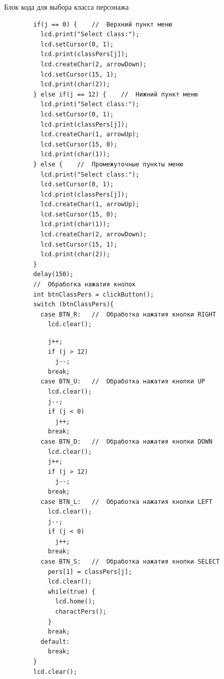 \documentclass[12pt,a4paper,mathserif]{beamer}
\begin{document}
\begin{frame}[fragile]{{\small Блок кода для выбора класса персонажа}}
    \begin{adjustbox}{width=\textwidth,height=\someheight,keepaspectratio}
    \begin{minipage}{1.1\linewidth}
    \begin{verbatim}
        if(j == 0) {    //  Верхний пункт меню
          lcd.print("Select class:");
          lcd.setCursor(0, 1);
          lcd.print(classPers[j]);
          lcd.createChar(2, arrowDown);
          lcd.setCursor(15, 1);
          lcd.print(char(2));
        } else if(j == 12) {    //  Нижний пункт меню
          lcd.print("Select class:");
          lcd.setCursor(0, 1);
          lcd.print(classPers[j]);
          lcd.createChar(1, arrowUp);
          lcd.setCursor(15, 0);
          lcd.print(char(1));
        } else {    //  Промежуточные пункты меню
          lcd.print("Select class:");
          lcd.setCursor(0, 1);
          lcd.print(classPers[j]);
          lcd.createChar(1, arrowUp);
          lcd.setCursor(15, 0);
          lcd.print(char(1));
          lcd.createChar(2, arrowDown);
          lcd.setCursor(15, 1);
          lcd.print(char(2));
        }
        delay(150);
        //  Обработка нажатия кнопок
        int btnClassPers = clickButton();
        switch (btnClassPers){
          case BTN_R:   //  Обработка нажатия кнопки RIGHT
            lcd.clear();
    \end{verbatim}
    \end{minipage}
    \hfill
    \begin{minipage}{1.1\linewidth}
    \begin{verbatim}
            j++;
            if (j > 12)
              j--;
            break;
          case BTN_U:   //  Обработка нажатия кнопки UP
            lcd.clear();
            j--;
            if (j < 0)
              j++;
            break;
          case BTN_D:   //  Обработка нажатия кнопки DOWN
            lcd.clear();
            j++;
            if (j > 12)
              j--;
            break;
          case BTN_L:   //  Обработка нажатия кнопки LEFT
            lcd.clear();
            j--;
            if (j < 0)
              j++;
            break;
          case BTN_S:   //  Обработка нажатия кнопки SELECT
            pers[1] = classPers[j];
            lcd.clear();
            while(true) {
              lcd.home();
              charactPers();
            }
            break;
          default:
            break;
        }
        lcd.clear();
    \end{verbatim}
    \end{minipage}
    \end{adjustbox}
\end{frame}
\end{document}
